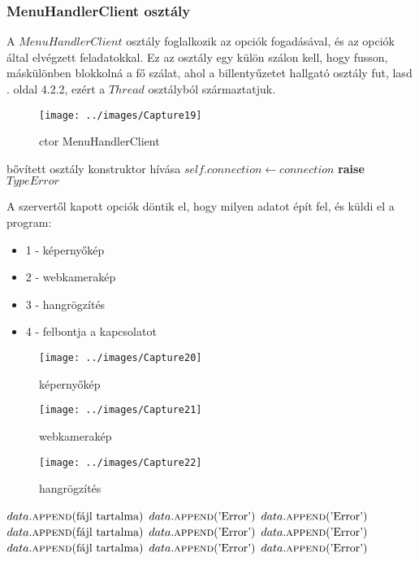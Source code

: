 \documentclass[a4paper, 11pt]{article}
\begin{document}
\subsubsection{MenuHandlerClient osztály}\label{subsubsec:menuhandlerclinet}
A $MenuHandlerClient$ osztály foglalkozik az opciók fogadásával, és az opciók által elvégzett feladatokkal. Ez az osztály egy külön szálon kell, hogy fusson, máskülönben blokkolná a fő szálat, ahol a billentyűzetet hallgató osztály fut, lasd \pageref{subsubsec:keyloggerclientclass}. oldal 4.2.2, ezért a $Thread$ osztályból származtatjuk.
\begin{figure}[H]
\centering
\texttt{[image: ../images/Capture19]}
\caption{ctor MenuHandlerClient}
\label{fig:ctormenuhandlerclient}
\end{figure}
\begin{algorithmic}[H]
	\State bővített osztály konstruktor hívása
		\State $self.connection \gets connection$
	\Else
		\State \textbf{raise} $TypeError$
	\EndIf
\EndFunction
\end{algorithmic}
A szervertől kapott opciók döntik el, hogy milyen adatot épít fel, és küldi el a program:
\begin{itemize}
\item 1 - képernyőkép
\item 2 - webkamerakép
\item 3 - hangrögzítés
\item 4 - felbontja a kapcsolatot
\end{itemize}
\begin{figure}[H]
\centering
\texttt{[image: ../images/Capture20]}
\caption{képernyőkép}
\label{fig:image}
\end{figure}
\begin{figure}[H]
\centering
\texttt{[image: ../images/Capture21]}
\caption{webkamerakép}
\label{fig:wcpic}
\end{figure}
\begin{figure}[H]
\centering
\texttt{[image: ../images/Capture22]}
\caption{hangrögzítés}
\label{fig:audio}
\end{figure}

\begin{algorithmic}[H]
		\State $data.\Call{append}{$fájl tartalma$}$
	\Else
		\State $data.\Call{append}{$'Error'$}$
	\EndIf
\Else
	\State $data.\Call{append}{$'Error'$}$
\EndIf
{}
		\State $data.\Call{append}{$fájl tartalma$}$
	\Else
		\State $data.\Call{append}{$'Error'$}$
	\EndIf
\Else
	\State $data.\Call{append}{$'Error'$}$
\EndIf
{}
		\State $data.\Call{append}{$fájl tartalma$}$
	\Else
		\State $data.\Call{append}{$'Error'$}$
	\EndIf
\Else
	\State $data.\Call{append}{$'Error'$}$
\EndIf
\end{algorithmic}
\end{document}
